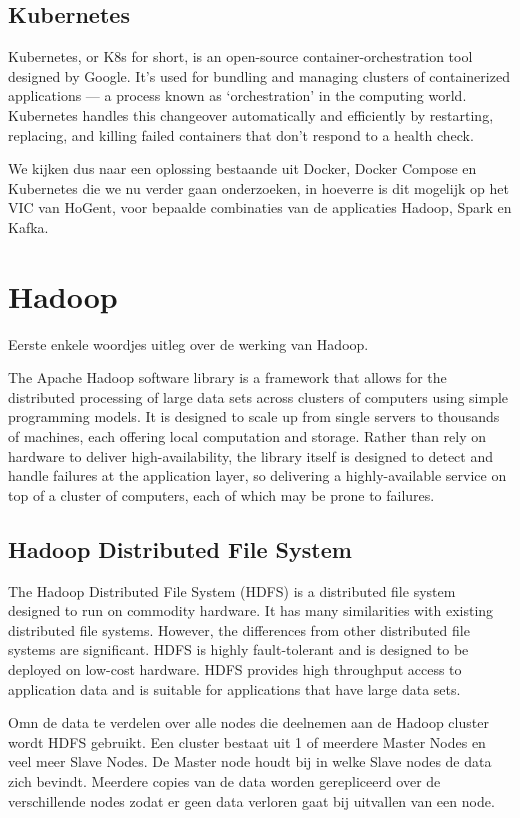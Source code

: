 \subsection{Kubernetes}
Kubernetes, or K8s for short, is an open-source container-orchestration tool designed by Google. It’s used for bundling and managing clusters of containerized applications — a process known as ‘orchestration’ in the computing world.
Kubernetes handles this changeover automatically and efficiently by restarting, replacing, and killing failed containers that don’t respond to a health check.\autocite{Guthrie2022}


We kijken dus naar een oplossing bestaande uit Docker, Docker Compose en Kubernetes die we nu verder gaan onderzoeken, in hoeverre is dit mogelijk op het VIC van HoGent, voor bepaalde combinaties van de applicaties Hadoop, Spark en Kafka.

\section{Hadoop}
Eerste enkele woordjes uitleg over de werking van Hadoop.

The Apache Hadoop software library is a framework that allows for the distributed processing of large data sets across clusters of computers using simple programming models. It is designed to scale up from single servers to thousands of machines, each offering local computation and storage. Rather than rely on hardware to deliver high-availability, the library itself is designed to detect and handle failures at the application layer, so delivering a highly-available service on top of a cluster of computers, each of which may be prone to failures.\autocite{ASF2022}

\subsection{Hadoop Distributed File System}
The Hadoop Distributed File System (HDFS) is a distributed file system designed to run on commodity hardware. It has many similarities with existing distributed file systems.
However, the differences from other distributed file systems are significant. HDFS is highly fault-tolerant and is designed to be deployed on low-cost hardware. HDFS provides high throughput access to application data and is suitable for applications that have large data sets.\autocite{Borthakur2007a}

Omn de data te verdelen over alle nodes die deelnemen aan de Hadoop cluster wordt HDFS gebruikt. Een cluster bestaat uit 1 of meerdere Master Nodes en veel meer Slave Nodes. De Master node houdt bij in welke Slave nodes de data zich bevindt. Meerdere copies van de data worden gerepliceerd over de verschillende nodes zodat er geen data verloren gaat bij uitvallen van een node.

